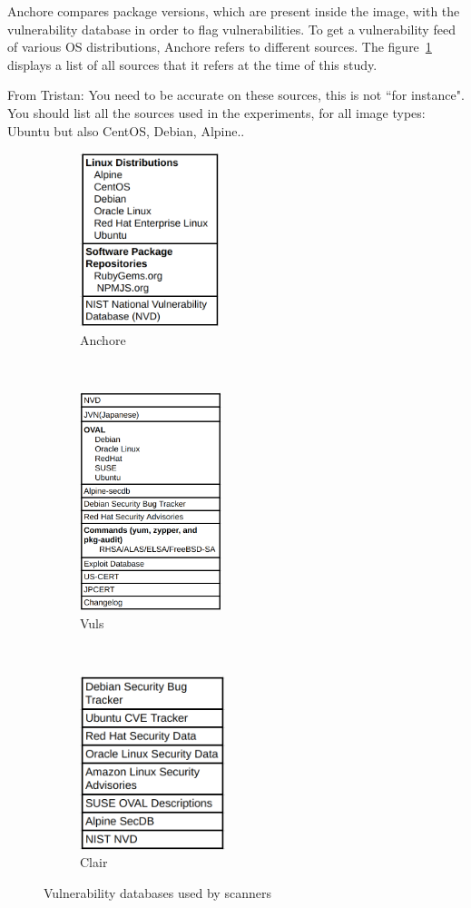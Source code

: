 \documentclass[a4paper,num-refs]{oup-contemporary}
\newcommand{\tristan}[1]{\color{blue}From Tristan: #1\color{black}}
\begin{document}
Anchore compares package versions, which are present inside the
image, with the vulnerability database in order to flag vulnerabilities.
To get a vulnerability feed of various OS distributions, Anchore refers to
different sources. The figure~\ref{anchore} displays a list of all sources
that it refers at the time of this study.

\tristan{You need to be accurate on these sources, this is not ``for instance". 
You should list all the sources used in the experiments, for all image types: Ubuntu but also CentOS, Debian, Alpine.}.

\begin{figure}[!ht]
    \centering
	\begin{subfigure}[t]{0.3\textwidth}
        \includegraphics[height=2.0in]{Figures/anchore.png}
        \caption{Anchore}
        \label{anchore}
    \end{subfigure}%
    ~ 
	\begin{subfigure}[t]{0.3\textwidth}
        \includegraphics[height=2.5in]{Figures/vuls.png}
        \caption{Vuls}
        \label{vuls}
    \end{subfigure}
     ~
	\begin{subfigure}[t]{0.3\textwidth}
        \includegraphics[height=2.0in]{Figures/clair.png}
        \caption{Clair}
	\label{clair}
    \end{subfigure}
    \caption{Vulnerability databases used by scanners}
    \label{database}
\end{figure}
\end{document}
